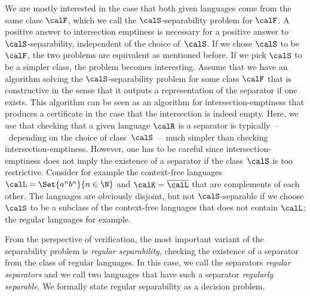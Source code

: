 \documentclass[../../diss.tex]{subfiles}
\begin{document}
\begin{problem}
\end{problem}

We are mostly interested in the case that both given languages come from the same class $\calF$, which we call the $\calS$-separability problem for $\calF$.
A positive answer to intersection emptiness is necessary for a positive answer to $\calS$-separability, independent of the choice of~$\calS$.
If we chose $\calS$ to be $\calF$, the two problems are equivalent as mentioned before.
If we pick $\calS$ to be a simpler class, the problem becomes interesting.
%
Assume that we have an algorithm solving the $\calS$-separability problem for some class $\calF$ that is constructive in the sense that it outputs a representation of the separator if one exists.
This algorithm can be seen as an algorithm for intersection-emptiness that produces a certificate in the case that the intersection is indeed empty.
Here, we use that checking that a given language $\calR$ is a separator is typically~--~depending on the choice of class~$\calS$~--~much simpler than checking intersection-emptiness.
%
However, one has to be careful since intersection-emptiness does not imply the existence of a separator if the class~$\calS$ is too restrictive.
Consider for example the context-free languages $\calL = \Set{a^n b^n}{n \in \N}$ and $\calK = \overline{\calL}$ that are complements of each other.
The languages are obviously disjoint, but not $\calS$-separable if we choose $\calS$ to be a subclass of the context-free languages that does not contain $\calL$; the regular languages for example.

From the perspective of verification, the most important variant of the separability problem is \emph{regular separability}, \ie checking the existence of a separator from the class of regular languages.
In this case, we call the separators \emph{regular separators} and we call two languages that have such a separator \emph{regularly separable}.
We formally state regular separability as a decision problem.

\begin{problem}
\end{problem}
\end{document}
